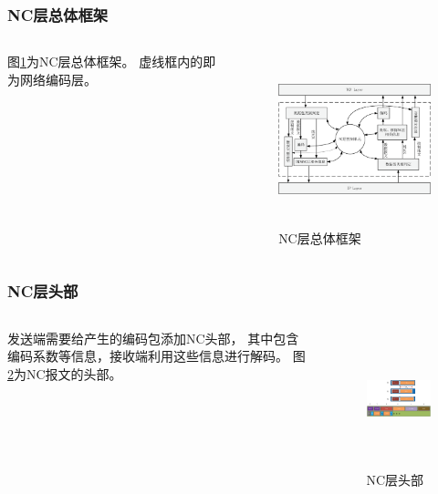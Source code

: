 \begin{frame}[t]
	\frametitle{NC层总体框架}
	\begin{columns}[t]
		\begin{column}{0.4\textwidth}
		图\ref{fig:jiagou}为NC层总体框架。
		虚线框内的即为网络编码层。
		\end{column}
		\begin{column}{0.5\textwidth}
			\vspace{-2.5em}
			\begin{figure}
				\includegraphics[height=5cm]{../figures/jiagou.eps}
				\caption{NC层总体框架}
				\label{fig:jiagou}
			\end{figure}
		\end{column}
	\end{columns}
\end{frame}
\begin{frame}
	\frametitle{NC层头部}
	\begin{columns}
		\begin{column}{0.4\textwidth}
			发送端需要给产生的编码包添加NC头部，
			其中包含编码系数等信息，接收端利用这些信息进行解码。
			图\ref{fig:codingheader}为NC报文的头部。
		\end{column}
		\begin{column}{0.6\textwidth}
			\begin{figure}
				\includegraphics[height=4cm]{../figures/codingheader.eps}
				\caption{NC层头部}
				\label{fig:codingheader}
			\end{figure}
		\end{column}
	\end{columns}
	\note{
	}
\end{frame}
